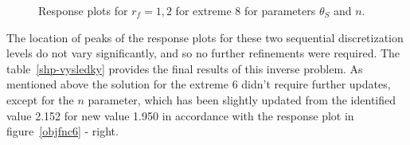 \documentclass[review,times,3p,10pt]{elsarticle}
\newcommand{\fs}{\footnotesize}
\begin{document}
\begin{figure}[htb!]
\label{ext6rf1-an2-example}
\caption{Response plots for $r_f=1,2$ for extreme 8 for parameters $\theta_S$ and $n$.}
\end{figure}


The location of peaks of the response plots for these two sequential discretization levels do not vary significantly, and so no further refinements were required. The table~\ref{shp-vysledky} provides the final results of this inverse problem. As mentioned above the solution for the extreme 6 didn't require further updates, except for  the $n$ parameter, which has been slightly updated from the identified value 2.152 for new value 1.950 in accordance with the response plot in figure~\ref{objfnc6} - right.

\end{document}

